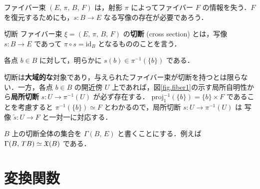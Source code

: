 \documentclass[geometry_main]{subfiles}
\begin{document}
ファイバー束 $(E,\, \pi,\, B,\, F)$ は，射影 $\pi$ によってファイバー $F$ の情報を失う．$F$ を復元するためにも，$s \colon B \to E$ なる写像の存在が必要であろう．

\begin{mydef}[label=def.section]{切断}
	ファイバー束 $\xi = (E,\, \pi,\, B,\, F)$ の\textbf{切断} (cross section) とは，\cinfty 写像 $s \colon B \to E$ であって $ \pi \circ s = \mathrm{id}_B$ となるもののことを言う．
\end{mydef}
各点 $b \in B$ に対して，明らかに $s(b) \in \pi^{-1}(\{b\})$ である．

切断は\textbf{大域的な}対象であり，与えられたファイバー束が切断を持つとは限らない．一方，各点 $b \in B$ の開近傍 $U$ 上であれば，図\ref{fig.fiber1}の示す局所自明性から\textbf{局所切断} $s \colon U \to \pi^{-1}(U)$ が必ず存在する．
$\mathrm{proj}_1^{-1}(\{	b \}) = \{b\} \times F$ であることを考慮すると $\pi^{-1}(\{b\}) \simeq F$ とわかるので，局所切断 $s \colon U \to \pi^{-1}(U)$ は \cinfty 写像 $\tilde{s} \colon U \to F$ と一対一に対応する．

$B$ 上の切断全体の集合を $\Gamma(B,\, E)$ と書くことにする．例えば $\Gamma(B,\, TB) \simeq \mathfrak{X}(B)$ である．

\section{変換関数}
\end{document}
